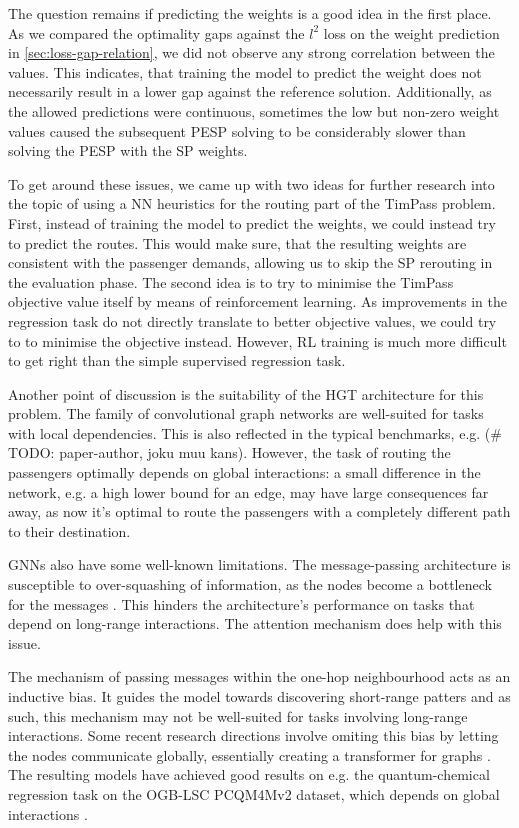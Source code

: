 \documentclass[english, 12pt, a4paper, sci, utf8, a-2b, online]{aaltothesis}
\begin{document}
The question remains if predicting the weights is a good idea in the first place. As we compared the optimality gaps against the $l^2$ loss on the weight prediction in \cref{sec:loss-gap-relation}, we did not observe any strong correlation between the values. This indicates, that training the model to predict the weight does not necessarily result in a lower gap against the reference solution. Additionally, as the allowed predictions were continuous, sometimes the low but non-zero weight values caused the subsequent PESP solving to be considerably slower than solving the PESP with the SP weights. %

To get around these issues, we came up with two ideas for further research into the topic of using a NN heuristics for the routing part of the TimPass problem. First, instead of training the model to predict the weights, we could instead try to predict the routes. This would make sure, that the resulting weights are consistent with the passenger demands, allowing us to skip the SP rerouting in the evaluation phase. The second idea is to try to minimise the TimPass objective value itself by means of reinforcement learning. As improvements in the regression task do not directly translate to better objective values, we could try to to minimise the objective instead. However, RL training is much more difficult to get right than the simple supervised regression task.

Another point of discussion is the suitability of the HGT architecture for this problem. The family of convolutional graph networks are well-suited for tasks with local dependencies. This is also reflected in the typical benchmarks, e.g. (\# TODO: paper-author, joku muu kans). However, the task of routing the passengers optimally depends on global interactions: a small difference in the network, e.g. a high lower bound for an edge, may have large consequences far away, as now it's optimal to route the passengers with a completely different path to their destination.

GNNs also have some well-known limitations. The message-passing architecture is susceptible to over-squashing of information, as the nodes become a bottleneck for the messages \cite{alon2020bottleneck}. This hinders the architecture's performance on tasks that depend on long-range interactions. The attention mechanism does help with this issue.

The mechanism of passing messages within the one-hop neighbourhood acts as an inductive bias. It guides the model towards discovering short-range patters and as such, this mechanism may not be well-suited for tasks involving long-range interactions. Some recent research directions involve omiting this bias by letting the nodes communicate globally, essentially creating a transformer for graphs \cite{ying2021transformers,hussain2022global}. The resulting models have achieved good results on e.g. the quantum-chemical
regression task on the OGB-LSC PCQM4Mv2 dataset, which depends on global interactions \cite{hu2021ogblsc}.
\end{document}
